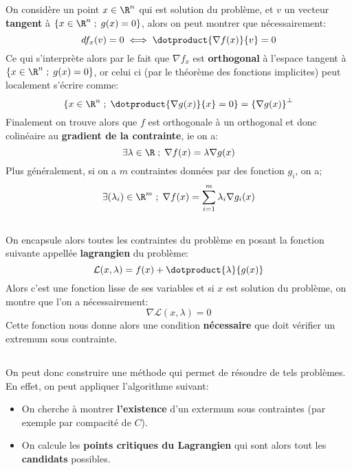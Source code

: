 \subsection*{}
On considère un point \( x \in \R^n \) qui est solution du problème, et \( v \) un vecteur \textbf{tangent} à \( \left\{ x \in \R^n \; ; \; g(x) = 0\right\}\), alors on peut montrer que nécessairement:
\[ 
   df_x(v) = 0 \iff \dotproduct{\nabla f(x)}{v} = 0
\]
Ce qui s'interprète alors par le fait que \( \nabla f_x \) est \textbf{orthogonal} à l'espace tangent à \( \left\{ x \in \R^n \; ; \; g(x) = 0\right\} \), or celui ci (par le théorème des fonctions implicites) peut localement s'écrire comme:
\[ 
   \left\{ x \in \R^n \; ; \; \dotproduct{\nabla g(x)}{x} = 0\right\} =  \left\{ \nabla g(x) \right\}^\perp 
\]
Finalement on trouve alors que \( f \) est orthogonale à un orthogonal et donc colinéaire au \textbf{gradient de la contrainte}, ie on a:
\[ 
   \exists \lambda \in \R \; ; \; \nabla f(x) = \lambda\nabla g(x) 
\]
Plus généralement, si on a \( m \) contraintes données par des fonction \( g_i \), on a;
\[ 
   \exists (\lambda_i) \in \R^m \; ; \; \nabla f(x) = \sum_{i=1}^m \lambda_i \nabla g_i(x) 
\]
\subsection*{}
On encapsule alors toutes les contraintes du problème en posant la fonction suivante appellée \textbf{lagrangien} du problème:
\[ 
   \mathcal{L}(x, \lambda) = f(x) + \dotproduct{\lambda}{g(x)} 
\]
Alors c'est une fonction lisse de ses variables et si \( x \) est solution du problème, on montre que l'on a nécessairement:
\[ 
   \nabla \mathcal{L}(x, \lambda) = 0
\]
Cette fonction nous donne alors une condition \textbf{nécessaire} que doit vérifier un extremum sous contrainte.
\subsection*{}
On peut donc construire une méthode qui permet de résoudre de tels problèmes. En effet, on peut appliquer l'algorithme suivant:
\begin{itemize}
   \item On cherche à montrer \textbf{l'existence} d'un extermum sous contraintes (par exemple par compacité de \( C \)).
   \item On calcule les \textbf{points critiques du Lagrangien} qui sont alors tout les \textbf{candidats} possibles.
\end{itemize}

